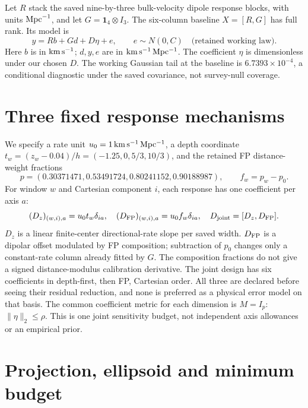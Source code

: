 \documentclass[aps,prd,reprint,onecolumn,superscriptaddress,nofootinbib]{revtex4-2}
\begin{document}
Let $R$ stack the saved nine-by-three bulk-velocity dipole response blocks, with units ${\rm Mpc}^{-1}$, and let $G=\mathbf 1_4\otimes I_3$. The six-column baseline $X=[R,G]$ has full rank. Its model is
\begin{equation}
 y=Rb+Gd+D\eta+e,\qquad e\sim N(0,C)\quad\text{(retained working law)}.
 \label{eq:model}
\end{equation}
Here $b$ is in ${\rm km\,s^{-1}}$; $d,y,e$ are in ${\rm km\,s^{-1}\,Mpc^{-1}}$. The coefficient $\eta$ is dimensionless under our chosen $D$. The working Gaussian tail at the baseline is $6.7393\times10^{-4}$, a conditional diagnostic under the saved covariance, not survey-null coverage.

\section{Three fixed response mechanisms}

We specify a rate unit $u_0=1\,{\rm km\,s^{-1}\,Mpc^{-1}}$, a depth coordinate $t_w=(z_w-0.04)/h=(-1.25,0,5/3,10/3)$, and the retained FP distance-weight fractions
\begin{equation}
 p=(0.30371471,0.53491724,0.80241152,0.90188987),\qquad f_w=p_w-p_0.
\end{equation}
For window $w$ and Cartesian component $i$, each response has one coefficient per axis $a$:
\begin{equation}
 (D_z)_{(w,i),a}=u_0t_w\delta_{ia},\quad
 (D_{\rm FP})_{(w,i),a}=u_0f_w\delta_{ia},\quad
 D_{\rm joint}=[D_z,D_{\rm FP}].
 \label{eq:design}
\end{equation}
$D_z$ is a linear finite-center directional-rate slope per saved width. $D_{\rm FP}$ is a dipolar offset modulated by FP composition; subtraction of $p_0$ changes only a constant-rate column already fitted by $G$. The composition fractions do not give a signed distance-modulus calibration derivative. The joint design has six coefficients in depth-first, then FP, Cartesian order. All three are declared before seeing their residual reduction, and none is preferred as a physical error model on that basis. The common coefficient metric for each dimension is $M=I_p$: $\|\eta\|_2\leq\rho$. This is one joint sensitivity budget, not independent axis allowances or an empirical prior.

\section{Projection, ellipsoid and minimum budget}
\end{document}
